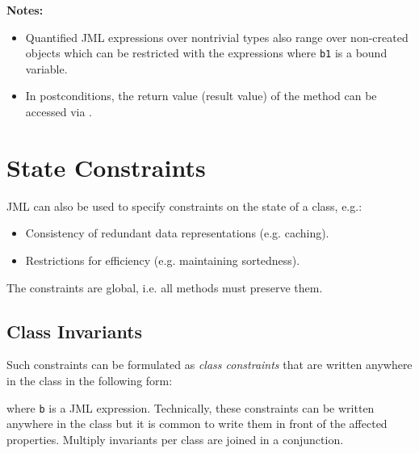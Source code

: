 		\textbf{Notes:}
		\begin{itemize}
			\item Quantified JML expressions over nontrivial types also range over non-created objects which can be restricted with the expressions  where \texttt{b1} is a bound variable.
			\item In postconditions, the return value (result value) of the method can be accessed via \inlineJava{\\result}.
		\end{itemize}

	\section{State Constraints}
		JML can also be used to specify constraints on the state of a class, e.g.:
		\begin{itemize}
			\item Consistency of redundant data representations (e.g. caching).
			\item Restrictions for efficiency (e.g. maintaining sortedness).
		\end{itemize}
		The constraints are global, i.e. all methods must preserve them.

		\subsection{Class Invariants}
			\label{sec:classinv}

			Such constraints can be formulated as \textit{class constraints} that are written anywhere in the class in the following form:
			\begin{center}
			\end{center}
			where \texttt{b} is a  JML expression. Technically, these constraints can be written anywhere in the class but it is common to write them in front of the affected properties. Multiply invariants per class are joined in a conjunction.

